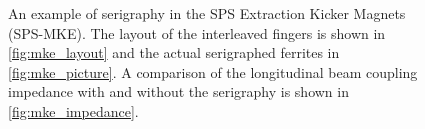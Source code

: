 \begin{figure}
\begin{center}
\end{center}
\caption{An example of serigraphy in the SPS Extraction Kicker Magnets (SPS-MKE). The layout of the interleaved fingers is shown in \ref{fig:mke_layout} and the actual serigraphed ferrites in \ref{fig:mke_picture}. A comparison of the longitudinal beam coupling impedance with and without the serigraphy is shown in \ref{fig:mke_impedance}.}
\label{fig:mke_figures}
\end{figure}

